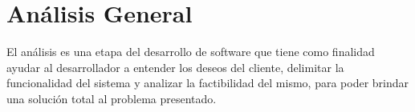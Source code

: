 
\chapter{Análisis General} %

\label{AnalisisGeneral} %


El análisis es una etapa del desarrollo de software que tiene como finalidad ayudar al desarrollador a entender los deseos del cliente, delimitar la funcionalidad del sistema y analizar la factibilidad del mismo, para poder brindar una solución total al problema presentado.



